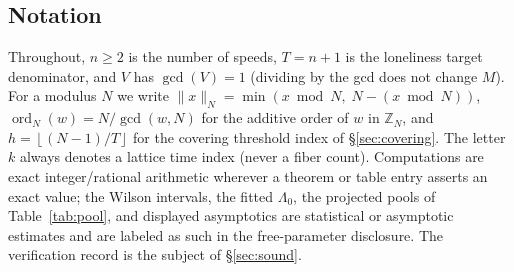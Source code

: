 \documentclass[11pt,a4paper]{article}
\numberwithin{equation}{section}
\theoremstyle{plain}
\theoremstyle{definition}
\theoremstyle{remark}
\newcommand{\Z}{\mathbb{Z}}
\newcommand{\floor}[1]{\left\lfloor #1 \right\rfloor}
\newcommand{\wn}[1]{\lVert #1 \rVert_{N}}
\DeclareMathOperator{\ord}{ord}
\begin{document}
\subsection{Notation}

Throughout, $n\ge 2$ is the number of speeds, $T=n+1$ is the loneliness
target denominator, and $V$ has $\gcd(V)=1$ (dividing by the gcd does
not change $M$). For a modulus $N$ we write $\wn{x}=\min(x\bmod N,\;
N-(x\bmod N))$, $\ord_N(w)=N/\gcd(w,N)$ for the additive order of $w$
in $\Z_N$, and $h=\floor{(N-1)/T}$ for the covering threshold index
of \S\ref{sec:covering}. The letter $k$ always denotes a lattice time
index (never a fiber count). Computations are exact integer/rational
arithmetic wherever a theorem or table entry asserts an exact value; the
Wilson intervals, the fitted $\Lambda_0$, the projected pools of
Table~\ref{tab:pool}, and displayed asymptotics are statistical or
asymptotic estimates and are labeled as such in the free-parameter
disclosure. The verification record is the subject of
\S\ref{sec:sound}.
\end{document}
